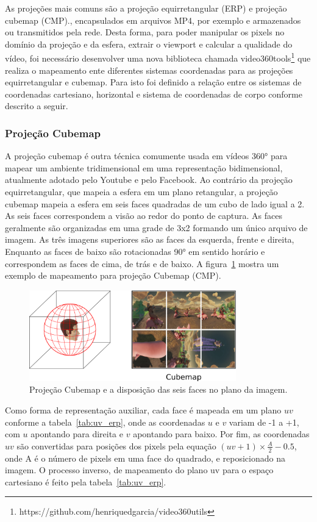 As projeções mais comuns são a projeção equirretangular (ERP) e projeção cubemap (CMP)., encapsulados em arquivos MP4, por exemplo e armazenados ou transmitidos pela rede. Desta forma, para poder manipular os pixels no domínio da projeção e da esfera, extrair o viewport e calcular a qualidade do vídeo, foi necessário desenvolver uma nova biblioteca chamada video360tools\footnote{https://github.com/henriquedgarcia/video360utils} que realiza o mapeamento ente diferentes sistemas coordenadas para as projeções equirretangular e cubemap. Para isto foi definido a relação entre os sistemas de coordenadas cartesiano, horizontal e sistema de coordenadas de corpo conforme descrito a seguir.


\subsubsection{Projeção Cubemap}

A projeção cubemap é outra técnica comumente usada em vídeos 360° para mapear um ambiente tridimensional em uma representação bidimensional, atualmente adotado pelo Youtube e pelo Facebook. Ao contrário da projeção equirretangular, que mapeia a esfera em um plano retangular, a projeção cubemap mapeia a esfera em seis faces quadradas de um cubo de lado igual a 2. As seis faces correspondem a visão ao redor do ponto de captura. As faces geralmente são organizadas em uma grade de 3x2 formando um único arquivo de imagem. As três imagens superiores são as faces da esquerda, frente e direita, Enquanto as faces de baixo são rotacionadas 90° em sentido horário e correspondem as faces de cima, de trás e de baixo. A figura~\ref{fig:cmp} mostra um exemplo de mapeamento para projeção Cubemap (CMP).

\begin{figure}
	\centering
	\includegraphics[width=0.8\textwidth]{fig/cmp.png}
	\caption{Projeção Cubemap e a disposição das seis faces no plano da imagem.}
	\label{fig:cmp}
\end{figure}

Como forma de representação auxiliar, cada face é mapeada em um plano $uv$ conforme a tabela~\ref{tab:uv_erp}, onde as coordenadas $u$ e $v$ variam de -1 a +1, com $u$ apontando para direita e $v$ apontando para baixo. Por fim, as coordenadas $uv$ são convertidas para posições dos pixels pela equação $ (uv+1)\times \frac{A}{2}-0.5$, onde A é o número de pixels em uma face do quadrado, e reposicionado na imagem. O processo inverso, de mapeamento do plano uv para o espaço cartesiano é feito pela tabela~\ref{tab:uv_erp}.

